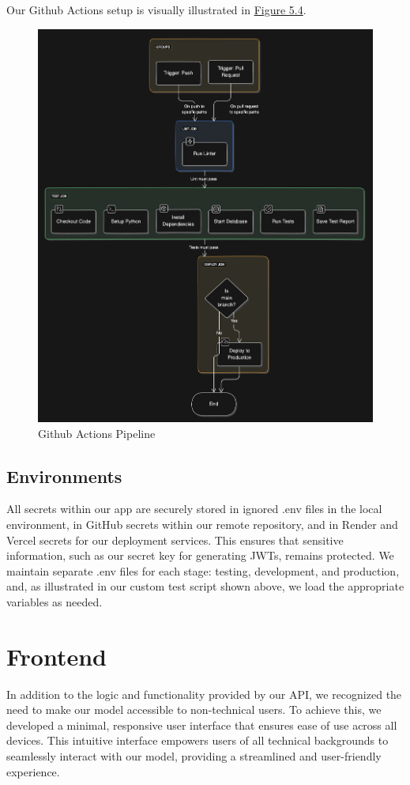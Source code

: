 Our Github Actions setup is visually illustrated in \hyperref[fig:backend-cicd]{Figure 5.4}.
\begin{figure}[ht]
    \centering
    \includegraphics[width=0.9\linewidth]{images/webapp/backend/cicd.png}
    \caption{Github Actions Pipeline}
    \label{fig:backend-cicd}
\end{figure}


\subsection{Environments}
All secrets within our app are securely stored in ignored .env files in the local environment, in GitHub secrets within our remote repository, and in Render and Vercel secrets for our deployment services. This ensures that sensitive information, such as our secret key for generating JWTs, remains protected. We maintain separate .env files for each stage: testing, development, and production, and, as illustrated in our custom test script shown above, we load the appropriate variables as needed.

\section{Frontend}
In addition to the logic and functionality provided by our API, we recognized the need to make our model accessible to non-technical users. To achieve this, we developed a minimal, responsive user interface that ensures ease of use across all devices. This intuitive interface empowers users of all technical backgrounds to seamlessly interact with our model, providing a streamlined and user-friendly experience.

